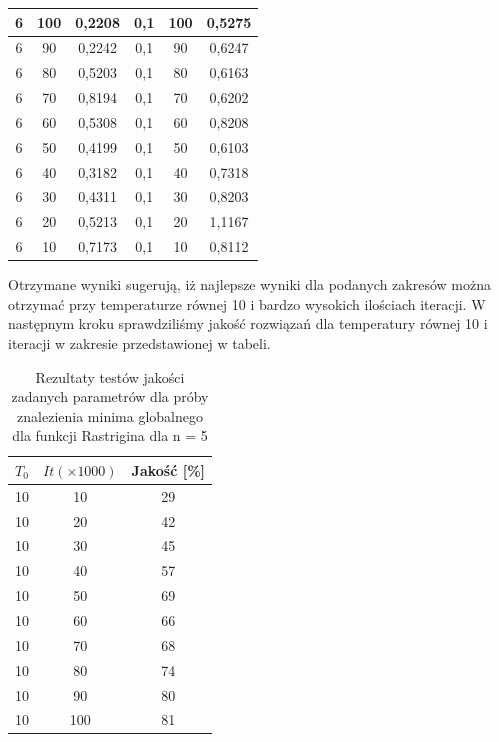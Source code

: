 \documentclass[twoside]{projektInzynierskiMS1}
\newcommand{\si}{ś}
\begin{document}
\begin{table}[htbp]
{\begin{tabular}{|c|c|c||c|c|c|}
6 & 100 & 0,2208 & 0,1 & 100 & 0,5275 \\ \hline 
6 & 90 & 0,2242& 0,1 & 90 & 0,6247 \\ \hline 
6 & 80 & 0,5203 & 0,1 & 80 & 0,6163 \\ \hline 
6 & 70 & 0,8194 & 0,1 & 70 & 0,6202 \\ \hline 
6 & 60 & 0,5308 & 0,1 & 60 & 0,8208 \\ \hline
6 & 50 & 0,4199& 0,1 & 50 & 0,6103 \\ \hline 
6 & 40 & 0,3182 & 0,1 & 40 & 0,7318\\ \hline 
6 & 30 & 0,4311 & 0,1 & 30 & 0,8203 \\ \hline 
6 & 20 & 0,5213 & 0,1 & 20 & 1,1167 \\ \hline 
6 & 10 & 0,7173 & 0,1 & 10 & 0,8112 \\ \hline 
\end{tabular} 
}
\end{table}



Otrzymane wyniki sugerują, iż najlepsze wyniki dla podanych zakresów można otrzymać przy temperaturze równej 10 i bardzo wysokich ilo\si ciach iteracji. W następnym kroku sprawdzili\si my jako\si ć rozwiązań dla temperatury równej 10 i iteracji w zakresie przedstawionej w tabeli. \\

\clearpage
\begin{table}[htbp]\centering
\def\sym#1{\ifmmode^{#1}\else\(^{#1}\)\fi}
\caption{Rezultaty testów jako\si ci zadanych parametrów dla próby znalezienia minima globalnego dla funkcji Rastrigina dla n = 5}
\renewcommand\arraystretch{1.333}
\begin{tabular}{|c|c|c|} 
                  \hline
 $T_0$ & $It (\times 1000)$& Jako\si ć [\%]\\ \hline
10 & 10 & 29 \\ \hline
10 & 20 & 42 \\ \hline
10 & 30 & 45 \\ \hline 
10 & 40 & 57 \\ \hline 
10 & 50 & 69 \\ \hline 
10 & 60 & 66 \\ \hline
10 & 70 & 68 \\ \hline 
10 & 80 & 74 \\ \hline 
10 & 90 &  80\\ \hline 
10 & 100 & 81 \\ \hline 
\end{tabular}
\end{table}
\end{document}
